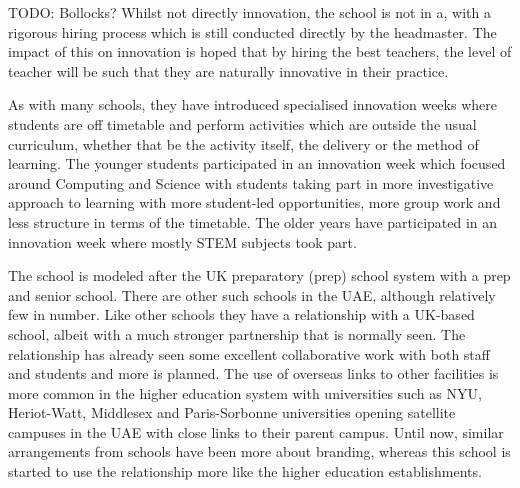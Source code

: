 TODO: Bollocks?
Whilst not directly innovation, the school is not in a, with a rigorous hiring process which is still conducted directly by the headmaster. The impact of this on innovation is hoped that by hiring the best teachers, the level of teacher will be such that they are naturally innovative in their practice.

As with many schools, they have introduced specialised innovation weeks where students are off timetable and perform activities which are outside the usual curriculum, whether that be the activity itself, the delivery or the method of learning. The younger students participated in an innovation week which focused around Computing and Science with students taking part in more investigative approach to learning with more student-led opportunities, more group work and less structure in terms of the timetable. The older years have participated in an innovation week where mostly STEM subjects took part.

The school is modeled after the UK preparatory (prep) school system with a prep and senior school. There are other such schools in the UAE, although relatively few in number. Like other schools they have a relationship with a UK-based school, albeit with a much stronger partnership that is normally seen. The relationship has already seen some excellent collaborative work with both staff and students and  more is planned. The use of overseas links to other facilities is more common in the higher education system with universities such as NYU, Heriot-Watt, Middlesex and Paris-Sorbonne universities opening satellite campuses in the UAE with close links to their parent campus. Until now, similar arrangements from schools have been more about branding, whereas this school is started to use the relationship more like the higher education establishments.

